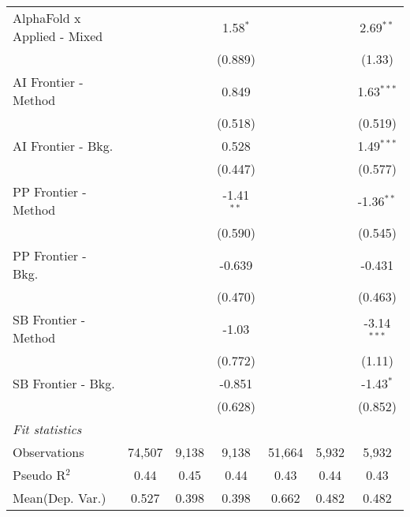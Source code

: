 \begin{tabular}{lcccccc}
   AlphaFold x Applied - Mixed &               &              & 1.58$^{*}$   &               &         & 2.69$^{**}$\\   
                               &               &              & (0.889)      &               &         & (1.33)\\   
   AI Frontier - Method        &               &              & 0.849        &               &         & 1.63$^{***}$\\   
                               &               &              & (0.518)      &               &         & (0.519)\\   
   AI Frontier - Bkg.          &               &              & 0.528        &               &         & 1.49$^{***}$\\   
                               &               &              & (0.447)      &               &         & (0.577)\\   
   PP Frontier - Method        &               &              & -1.41$^{**}$ &               &         & -1.36$^{**}$\\   
                               &               &              & (0.590)      &               &         & (0.545)\\   
   PP Frontier - Bkg.          &               &              & -0.639       &               &         & -0.431\\   
                               &               &              & (0.470)      &               &         & (0.463)\\   
   SB Frontier - Method        &               &              & -1.03        &               &         & -3.14$^{***}$\\   
                               &               &              & (0.772)      &               &         & (1.11)\\   
   SB Frontier - Bkg.          &               &              & -0.851       &               &         & -1.43$^{*}$\\   
                               &               &              & (0.628)      &               &         & (0.852)\\   
   \midrule
   \emph{Fit statistics}\\
   Observations                & 74,507        & 9,138        & 9,138        & 51,664        & 5,932   & 5,932\\  
   Pseudo R$^2$                & 0.44          & 0.45         & 0.44         & 0.43          & 0.44    & 0.43\\  
Mean(Dep. Var.) & 0.527 & 0.398 & 0.398 & 0.662 & 0.482 & 0.482 \\
   

\end{tabular}
